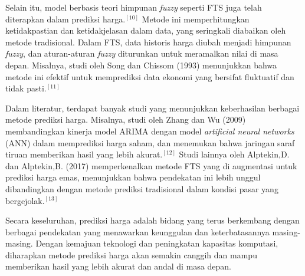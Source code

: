 \documentclass[conference]{IEEEtran}
\begin{document}
Selain itu, model berbasis teori himpunan \textit{fuzzy} seperti FTS juga telah diterapkan dalam prediksi harga.$^{[10]}$ Metode ini memperhitungkan ketidakpastian dan ketidakjelasan dalam data, yang seringkali diabaikan oleh metode tradisional. Dalam FTS, data historis harga diubah menjadi himpunan \textit{fuzzy}, dan aturan-aturan \textit{fuzzy} diturunkan untuk meramalkan nilai di masa depan. Misalnya, studi oleh Song dan Chissom (1993) menunjukkan bahwa metode ini efektif untuk memprediksi data ekonomi yang bersifat fluktuatif dan tidak pasti.$^{[11]}$

Dalam literatur, terdapat banyak studi yang menunjukkan keberhasilan berbagai metode prediksi harga. Misalnya, studi oleh Zhang dan Wu (2009) membandingkan kinerja model ARIMA dengan model \textit{artificial neural networks} (ANN) dalam memprediksi harga saham, dan menemukan bahwa jaringan saraf tiruan memberikan hasil yang lebih akurat.$^{[12]}$ Studi lainnya oleh Alptekin,D. dan Alptekin,B. (2017) memperkenalkan metode FTS yang di augmentasi untuk prediksi harga emas, menunjukkan bahwa pendekatan ini lebih unggul dibandingkan dengan metode prediksi tradisional dalam kondisi pasar yang bergejolak.$^{[13]}$

Secara keseluruhan, prediksi harga adalah bidang yang terus berkembang dengan berbagai pendekatan yang menawarkan keunggulan dan keterbatasannya masing-masing. Dengan kemajuan teknologi dan peningkatan kapasitas komputasi, diharapkan metode prediksi harga akan semakin canggih dan mampu memberikan hasil yang lebih akurat dan andal di masa depan.


\end{document}
